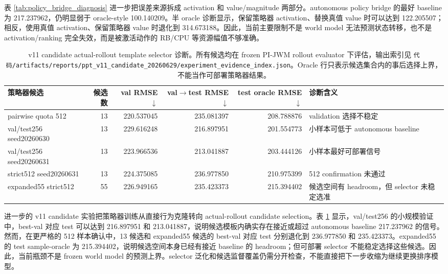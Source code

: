\documentclass[letterpaper,journal]{IEEEtran}
\newcommand{\code}[1]{\texttt{#1}}
\newcommand{\pjwm}{PI-JWM}
\newcommand{\tabfontsize}{\footnotesize}
\begin{document}
表 \ref{tab:policy_bridge_diagnosis} 进一步把误差来源拆成 activation 和 value/magnitude 两部分。autonomous policy bridge 的最好 baseline 为 217.237962，仍明显弱于 oracle-style 100.140209。半 oracle 诊断显示，保留策略器 activation、替换真值 value 时可以达到 122.205507；相反，使用真值 activation、保留策略器 value 时退化到 314.673188。因此，当前主要限制不是 world model 无法预测状态转移，也不是 activation/ranking 完全失效，而是被激活动作的 RB/CPU 等资源幅值不够准确。

\begin{table}[t]
\centering
\tabfontsize
\begin{tabular}{lrrrrl}
\toprule
策略器候选 & 候选数 & val RMSE$\downarrow$ & val$\rightarrow$test RMSE$\downarrow$ & test oracle RMSE$\downarrow$ & 诊断含义 \\
\midrule
pairwise quota 512 & 13 & 220.537045 & 235.081397 & 208.788876 & validation 选择不稳定 \\
val/test256 seed20260630 & 13 & 229.616248 & 216.897951 & 201.554773 & 小样本可低于 autonomous baseline \\
val/test256 seed20260631 & 13 & 223.966536 & 213.041887 & 203.444126 & 小样本最好可部署信号 \\
strict512 seed20260631 & 13 & 224.375085 & 236.977850 & 210.975399 & 512 confirmation 未通过 \\
expanded55 strict512 & 55 & 226.949165 & 235.423373 & 215.394402 & 候选空间有 headroom，但 selector 未稳定选准 \\
\bottomrule
\end{tabular}
\caption{v11 candidate actual-rollout template selector 诊断。所有候选均在 frozen \pjwm{} rollout evaluator 下评估，输出索引见 \code{代码/artifacts/reports/ppt\_v11\_candidate\_20260629/experiment\_evidence\_index.json}。Oracle 行只表示候选集合内的事后选择上界，不能当作可部署策略器结果。}
\label{tab:v11_actual_rollout_selector}
\end{table}

进一步的 v11 candidate 实验把策略器训练从直接行为克隆转向 actual-rollout candidate selection。表 \ref{tab:v11_actual_rollout_selector} 显示，val/test256 的小规模验证中，best-val 对应 test 可以达到 216.897951 和 213.041887，说明候选模板内确实存在接近或超过 autonomous baseline 217.237962 的信号。然而，在更严格的 512 样本确认中，13 候选和 expanded55 候选的 best-val 对应 test 分别退化到 236.977850 和 235.423373。expanded55 的 test sample-oracle 为 215.394402，说明候选空间本身已经有接近 baseline 的 headroom；但可部署 selector 不能稳定选择这些候选。因此，当前瓶颈不是 frozen world model 的预测上界。selector 泛化和候选监督覆盖仍需分开检查，不能直接把下一步收缩为继续更换排序模型。
\end{document}
